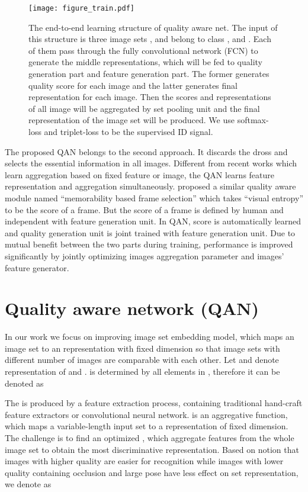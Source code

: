 \documentclass[10pt,twocolumn,letterpaper]{article}
\begin{document}
\label{sec:qualitynet}
\begin{figure*}[!htbp]
  \centering
  \texttt{[image: figure\_train.pdf]}
  \caption{The end-to-end learning structure of quality aware net. The input of this structure is three image sets ,  and  belong to class ,  and . Each of them pass through the fully convolutional network (FCN) to generate the middle representations, which will be fed to quality generation part and feature generation part. The former generates quality score for each image and the latter generates final representation for each image. Then the scores and representations of all image will be aggregated by set pooling unit and the final representation of the image set will be produced. We use softmax-loss and triplet-loss to be the supervised ID signal. }
\label{figure_train}
\end{figure*}


The proposed QAN belongs to the second approach. It 
discards the dross and selects the essential information in all images. Different from recent works which learn aggregation based on fixed feature \cite{yang2016neural} or image\cite{hassner2016pooling}, the QAN learns feature representation and aggregation simultaneously.  \cite{goswami2014mdlface} proposed a similar quality aware module named ``memorability based frame selection'' which  takes ``visual entropy'' to be the score of a frame. But the score of a frame is defined by human and independent with feature generation unit. In QAN,  score is automatically learned and quality generation unit is joint trained with feature generation unit. Due to mutual benefit between the two parts during training, performance is improved significantly by jointly optimizing images aggregation parameter and images' feature generator.


 \section{Quality aware network (QAN)}

In our work we focus on improving image set embedding model, which maps an image set  to an representation with fixed dimension so that image sets with different number of images are comparable with each other. Let  and  denote representation of  and .  is determined by all elements in , therefore it can be denoted as


The  is produced by a feature extraction process, containing  traditional hand-craft feature extractors or convolutional neural network.   is an aggregative function, which maps a variable-length input set to a representation of fixed dimension. The challenge is to find an optimized , which aggregate features from the whole image set to obtain the most discriminative representation. 
Based on notion that images with higher quality are easier for recognition while images with lower quality containing occlusion and large pose have less effect on set representation, we denote  as
\end{document}
